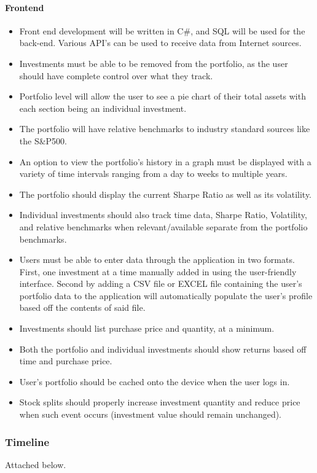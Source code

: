 \documentclass[onecolumn, draftclsnofoot,10pt, compsoc]{IEEEtran}
\begin{document}
\paragraph{Frontend}
\begin{itemize}
	\item Front end development will be written in C\#, and SQL will be used for the back-end. Various API's can be used to receive data from Internet sources.  
	\item Investments must be able to be removed from the portfolio, as the user should 
		have complete control over what they track. 
	\item Portfolio level will allow the user to see a pie chart of their total assets with each section being an individual investment.
	\item The portfolio will have relative benchmarks to industry standard sources like the S\&P500.
	\item An option to view the portfolio's history in a graph must be displayed with a variety of time intervals ranging from a day to weeks to multiple years.
	\item The portfolio should display the current Sharpe Ratio as well as its volatility.
	\item Individual investments should also track time data, Sharpe Ratio, Volatility, and relative benchmarks when relevant/available separate from the portfolio benchmarks.
	\item Users must be able to enter data through the application in two formats. First, one investment at a time manually added in using the user-friendly interface. Second by
		adding a CSV file or EXCEL file containing the user's portfolio data to the application will automatically populate the user's profile based off the contents of said file.
	\item Investments should list purchase price and quantity, at a minimum.
	\item Both the portfolio and individual investments should show returns based off time and purchase price.
	\item User's portfolio should be cached onto the device when the user logs in.
	\item Stock splits should properly increase investment quantity and reduce price when such event occurs (investment value should remain unchanged).

	
\end{itemize}
\subsubsection{Timeline}
Attached below.
\end{document}
